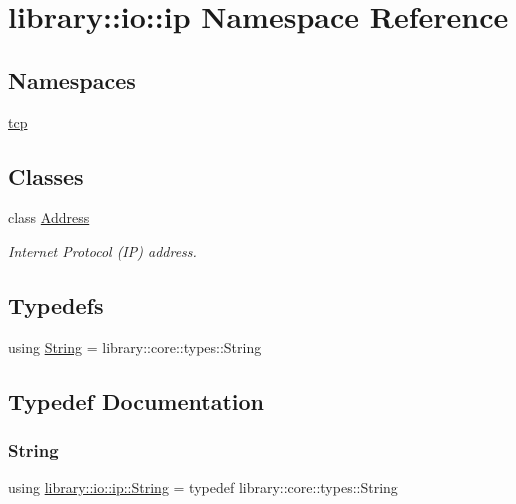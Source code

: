 \hypertarget{namespacelibrary_1_1io_1_1ip}{}\section{library\+:\+:io\+:\+:ip Namespace Reference}
\label{namespacelibrary_1_1io_1_1ip}
\subsection*{Namespaces}
\begin{DoxyCompactItemize}
\item 
 \hyperlink{namespacelibrary_1_1io_1_1ip_1_1tcp}{tcp}
\end{DoxyCompactItemize}
\subsection*{Classes}
\begin{DoxyCompactItemize}
\item 
class \hyperlink{classlibrary_1_1io_1_1ip_1_1_address}{Address}
\begin{DoxyCompactList}\small\item\em Internet Protocol (IP) address. \end{DoxyCompactList}\end{DoxyCompactItemize}
\subsection*{Typedefs}
\begin{DoxyCompactItemize}
\item 
using \hyperlink{namespacelibrary_1_1io_1_1ip_a2ac70ed8dfa9969304e09cead6a39459}{String} = library\+::core\+::types\+::\+String
\end{DoxyCompactItemize}


\subsection{Typedef Documentation}
\mbox{\label{namespacelibrary_1_1io_1_1ip_a2ac70ed8dfa9969304e09cead6a39459}} 
\subsubsection{\texorpdfstring{String}{String}}
{\footnotesize\ttfamily using \hyperlink{namespacelibrary_1_1io_1_1ip_a2ac70ed8dfa9969304e09cead6a39459}{library\+::io\+::ip\+::\+String} = typedef library\+::core\+::types\+::\+String}

